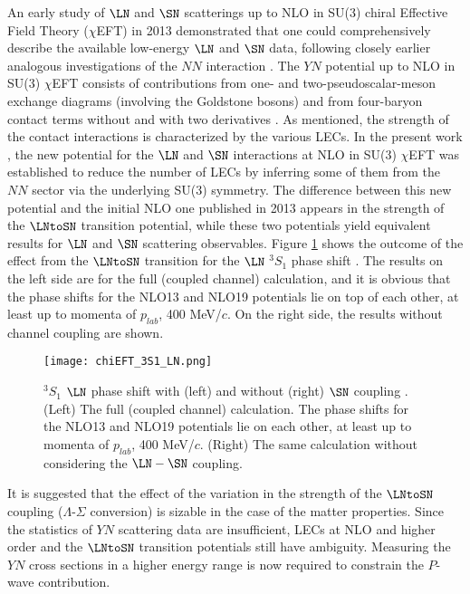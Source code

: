An early study of $\LN$ and $\SN$ scatterings up to NLO in SU(3) chiral Effective Field Theory ($\chi$EFT) in 2013 demonstrated that one could comprehensively describe the available low-energy $\LN$ and $\SN$ data, following closely earlier analogous investigations of the $NN$ interaction \cite{chiEFT-2013}. The $YN$ potential up to NLO in SU(3) $\chi$EFT consists of contributions from one- and two-pseudoscalar-meson exchange diagrams (involving the Goldstone bosons) and from four-baryon contact terms without and with two derivatives \cite{chiEFT-2020}. As mentioned, the strength of the contact interactions is characterized by the various LECs. In the present work \cite{chiEFT-2020}, the new potential for the $\LN$ and $\SN$ interactions at NLO in SU(3) $\chi$EFT was established to reduce the number of LECs by inferring some of them from the $NN$ sector via the underlying SU(3) symmetry. The difference between this new potential and the initial NLO one published in 2013 \cite{chiEFT-2013} appears in the strength of the $\LNtoSN$ transition potential, while these two potentials yield equivalent results for $\LN$ and $\SN$ scattering observables. Figure \ref{fig-chiEFT_3S1_LN} shows the outcome of the effect from the $\LNtoSN$ transition for the $\LN$ $^3S_1$ phase shift \cite{chiEFT-2020}. The results on the left side are for the full (coupled channel) calculation, and it is obvious that the phase shifts for the NLO13 and NLO19 potentials lie on top of each other, at least up to momenta of $p_{lab}$, 400 MeV/$c$. On the right side, the results without channel coupling are shown.
\begin{figure}[h]
 \begin{center}
   \texttt{[image: chiEFT\_3S1\_LN.png]}
   \caption{$^3S_1$ $\LN$ phase shift with (left) and without (right) $\SN$ coupling \cite{chiEFT-2020}. (Left) The full (coupled channel) calculation. The phase shifts for the NLO13 and NLO19 potentials lie on each other, at least up to momenta of $p_{lab}$, 400 MeV/$c$. (Right) The same calculation without considering the $\LN - \SN$ coupling.}
   \label{fig-chiEFT_3S1_LN}
 \end{center}
\end{figure}

It is suggested that the effect of the variation in the strength of the $\LNtoSN$ coupling ($\Lambda$-$\Sigma$ conversion) is sizable in the case of the matter properties. %
Since the statistics of $YN$ scattering data are insufficient, LECs at NLO and higher order and the $\LNtoSN$ transition potentials still have ambiguity. Measuring the $YN$ cross sections in a higher energy range is now required to constrain the $P$-wave contribution. %

